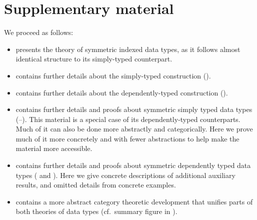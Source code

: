 \section*{Supplementary material}

We proceed as follows:
\begin{itemize}
\item {} presents the theory of symmetric indexed
  data types, as it follows almost identical structure to its
  simply-typed counterpart.
\item {} contains further details
  about the simply-typed \WLOG{} construction ().
\item {} contains further details
  about the dependently-typed \WLOG{} construction ().
\item {} contains further details and
  proofs about symmetric simply typed data types (--).  This material is a
  special case of its dependently-typed counterparts. Much of it can
  also be done more abstractly and categorically. Here we prove much
  of it more concretely and with fewer abstractions to help make the
  material more accessible.
\item {} contains further details and proofs
  about symmetric dependently typed data types ( and ). Here we give concrete
  descriptions of additional auxiliary results, and omitted details
  from concrete examples.
\item {} contains a more abstract category theoretic
  development that unifies parts of both theories of data types
  (cf.~summary figure in ).
\end{itemize}
